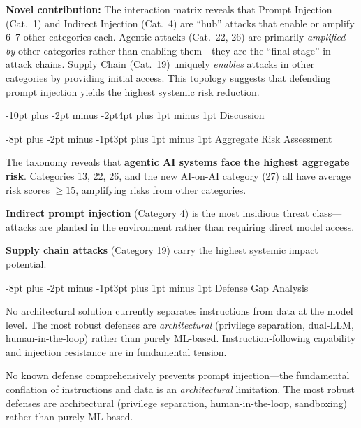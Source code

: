 \documentclass[conference]{IEEEtran}
\makeatletter
\renewcommand{\section}{\@startsection{section}{1}{\z@}%
  {-10pt plus -2pt minus -2pt}{4pt plus 1pt minus 1pt}%
  {\normalfont\large\bfseries\sffamily\color{accentdark}}}
\renewcommand{\subsection}{\@startsection{subsection}{2}{\z@}%
  {-8pt plus -2pt minus -1pt}{3pt plus 1pt minus 1pt}%
  {\normalfont\normalsize\bfseries\sffamily\color{accentblue}}}
\makeatother
\begin{document}
\begin{tcolorbox}[novelbox]
\textbf{Novel contribution:} The interaction matrix reveals that Prompt Injection (Cat.~1) and Indirect Injection (Cat.~4) are ``hub'' attacks that enable or amplify 6--7 other categories each. Agentic attacks (Cat.~22, 26) are primarily \emph{amplified by} other categories rather than enabling them---they are the ``final stage'' in attack chains. Supply Chain (Cat.~19) uniquely \emph{enables} attacks in other categories by providing initial access. This topology suggests that defending prompt injection yields the highest systemic risk reduction.
\end{tcolorbox}


\section{Discussion}


\subsection{Aggregate Risk Assessment}

The taxonomy reveals that \textbf{agentic AI systems face the highest aggregate risk}. Categories 13, 22, 26, and the new AI-on-AI category (27) all have average risk scores $\geq 15$, amplifying risks from other categories.

\textbf{Indirect prompt injection} (Category 4) is the most insidious threat class---attacks are planted in the environment rather than requiring direct model access.

\textbf{Supply chain attacks} (Category 19) carry the highest systemic impact potential.

\subsection{Defense Gap Analysis}

\begin{tcolorbox}[keyfinding, title={Key Finding: Prompt Injection Remains Fundamentally Unsolved}]
No architectural solution currently separates instructions from data at the model level. The most robust defenses are \emph{architectural} (privilege separation, dual-LLM, human-in-the-loop) rather than purely ML-based. Instruction-following capability and injection resistance are in fundamental tension.
\end{tcolorbox}

\begin{tcolorbox}[keyfinding, title={Key Finding}]
No known defense comprehensively prevents prompt injection---the fundamental conflation of instructions and data is an \emph{architectural} limitation. The most robust defenses are architectural (privilege separation, human-in-the-loop, sandboxing) rather than purely ML-based.
\end{tcolorbox}
\end{document}
